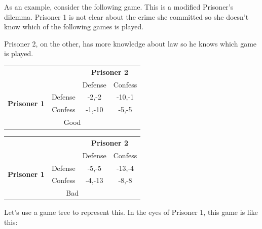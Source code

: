 \documentclass[12pt, oneside]{article}
\begin{document}
As an example, consider the following game. This is a modified Prisoner’s dilemma. Prisoner 1 is not clear about the crime she committed so she doesn’t know which of the following games is played.

Prisoner 2, on the other, has more knowledge about law so he knows which game is played.

\begin{table}[h]
    \centering
    \renewcommand{\arraystretch}{1.2}
    \setlength{\tabcolsep}{8pt}
    \begin{tabular}{c c|c c|}
        \multicolumn{2}{c}{} & \multicolumn{2}{c}{\textbf{Prisoner 2}} \\
        \multicolumn{2}{c}{} & Defense & Confess \\
        \cline{2-4}
        \multirow{2}{*}{\textbf{Prisoner 1}} & Defense & -2,-2 & -10,-1 \\
        & Confess & -1,-10 & -5,-5 \\
        \cline{2-4}
        \multicolumn{4}{c}{Good}
    \end{tabular}
    \hspace{1cm}
    \begin{tabular}{c c|c c|}
        \multicolumn{2}{c}{} & \multicolumn{2}{c}{\textbf{Prisoner 2}} \\
        \multicolumn{2}{c}{} & Defense & Confess \\
        \cline{2-4}
        \multirow{2}{*}{\textbf{Prisoner 1}} & Defense & -5,-5 & -13,-4 \\
        & Confess & -4,-13 & -8,-8 \\
        \cline{2-4}
        \multicolumn{4}{c}{Bad}
    \end{tabular}
\end{table}
\break
Let's use a game tree to represent this. In the eyes of Prisoner 1, this game is like this:

\begin{center}
\end{center}
\end{document}
